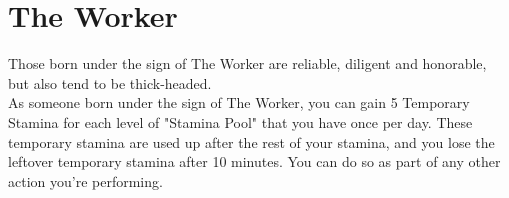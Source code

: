 \section{The Worker}

Those born under the sign of The Worker are reliable, diligent and honorable, but also tend to be thick-headed.\\
As someone born under the sign of The Worker, you can gain 5 Temporary Stamina for each level of "Stamina Pool" that you have once per day. These temporary stamina are used up after the rest of your stamina, and you lose the leftover temporary stamina after 10 minutes. You can do so as part of any other action you're performing.\\